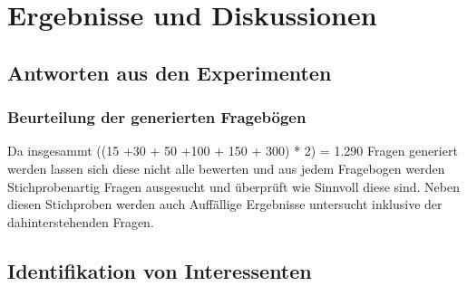 \chapter{Ergebnisse und Diskussionen}

\section{Antworten aus den Experimenten}

\subsection{Beurteilung der generierten Fragebögen}

Da insgesammt ((15 +30 + 50 +100 + 150 + 300) * 2) = 1.290 Fragen generiert werden lassen sich diese nicht alle bewerten und aus jedem Fragebogen werden Stichprobenartig Fragen ausgesucht und überprüft wie Sinnvoll diese sind.
Neben diesen Stichproben werden auch Auffällige Ergebnisse untersucht inklusive der dahinterstehenden Fragen.

\section{Identifikation von Interessenten}